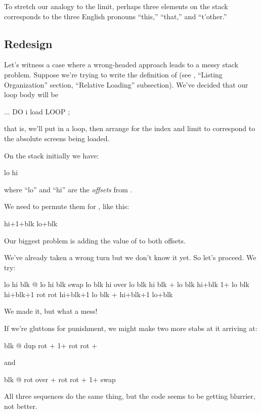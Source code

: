 To stretch our analogy to the limit, perhaps three elements on the
stack corresponds to the three English pronouns ``this,'' ``that,'' and
``t'other.''%

\subsection{Redesign}

Let's witness a case where a wrong-headed approach leads to a messy
stack problem. Suppose we're trying to write the definition of 
(see , ``Listing Organization'' section, ``Relative Loading''
subsection). We've decided that our loop body will be

\begin{Code}
...  DO  i load  LOOP ;
\end{Code}
that is, we'll put  in a loop, then arrange for the index and
limit to correspond to the absolute screens being loaded.

On the stack initially we have:

\begin{Code}
lo hi
\end{Code}
where ``lo'' and ``hi'' are the \emph{offsets} from .

We need to permute them for , like this:

\begin{Code}
hi+1+blk lo+blk
\end{Code}
Our biggest problem is adding the value of  to both offsets.

We've already taken a wrong turn but we don't know it yet. So let's
proceed. We try:

\begin{Code}
lo hi
               blk @
lo hi blk
               swap
lo blk hi
               over
lo blk hi blk
               +
lo blk hi+blk
               1+
lo blk hi+blk+1
               rot rot
hi+blk+1 lo blk
               +
hi+blk+1 lo+blk
\end{Code}
We made it, but what a mess!

If we're gluttons for punishment, we might make two more stabs at
it arriving at:

\begin{Code}
blk @  dup rot + 1+  rot rot +
\end{Code}
and

\begin{Code}
blk @  rot over +  rot rot + 1+  swap
\end{Code}
All three sequences do the same thing, but the code seems to be getting
blurrier, not better.

